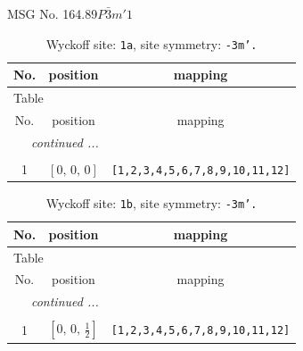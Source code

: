 \documentclass[fleqn,8pt]{jsarticle}
\begin{document}
\setcounter{MaxMatrixCols}{32}

\renewcommand{\tablename}{Table~}
\renewcommand{\figurename}{Figure~}
\begin{center}
\LARGE
MSG No. 164.89\quad$P\bar{3}m'1$
\end{center}
\renewcommand{\arraystretch}{1.2}
\begin{longtable}{ccc}
\caption{Wyckoff site: {\tt 1a}, site symmetry: {\tt -3m'.}}
 \\
 \hline \hline
No. & position & mapping \\ \hline \endfirsthead

\multicolumn{2}{l}{\tablename\ \thetable{}} \\
 \hline \hline
No. & position & mapping \\ \hline \endhead

 \hline \hline
\multicolumn{2}{r}{\footnotesize\it continued ...} \\ \endfoot

 \hline \hline
\multicolumn{2}{r}{} \\ \endlastfoot

1 & $\left[ 0,\, 0,\, 0 \right]$ & {\tt [1,2,3,4,5,6,7,8,9,10,11,12]} \\
\end{longtable}
\renewcommand{\arraystretch}{1.2}
\begin{longtable}{ccc}
\caption{Wyckoff site: {\tt 1b}, site symmetry: {\tt -3m'.}}
 \\
 \hline \hline
No. & position & mapping \\ \hline \endfirsthead

\multicolumn{2}{l}{\tablename\ \thetable{}} \\
 \hline \hline
No. & position & mapping \\ \hline \endhead

 \hline \hline
\multicolumn{2}{r}{\footnotesize\it continued ...} \\ \endfoot

 \hline \hline
\multicolumn{2}{r}{} \\ \endlastfoot

1 & $\left[ 0,\, 0,\, \frac{1}{2} \right]$ & {\tt [1,2,3,4,5,6,7,8,9,10,11,12]} \\
\end{longtable}
\renewcommand{\arraystretch}{1.2}
\end{document}
